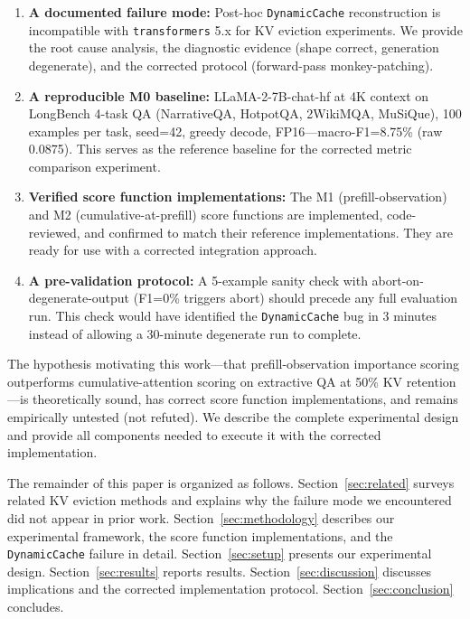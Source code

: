 \begin{enumerate}
\item \textbf{A documented failure mode:} Post-hoc \texttt{DynamicCache} reconstruction is incompatible with \texttt{transformers} 5.x for KV eviction experiments. We provide the root cause analysis, the diagnostic evidence (shape correct, generation degenerate), and the corrected protocol (forward-pass monkey-patching).

\item \textbf{A reproducible M0 baseline:} LLaMA-2-7B-chat-hf at 4K context on LongBench 4-task QA (NarrativeQA, HotpotQA, 2WikiMQA, MuSiQue), 100 examples per task, seed=42, greedy decode, FP16---macro-F1=8.75\% (raw 0.0875). This serves as the reference baseline for the corrected metric comparison experiment.

\item \textbf{Verified score function implementations:} The M1 (prefill-observation) and M2 (cumulative-at-prefill) score functions are implemented, code-reviewed, and confirmed to match their reference implementations. They are ready for use with a corrected integration approach.

\item \textbf{A pre-validation protocol:} A 5-example sanity check with abort-on-degenerate-output (F1=0\% triggers abort) should precede any full evaluation run. This check would have identified the \texttt{DynamicCache} bug in 3 minutes instead of allowing a 30-minute degenerate run to complete.
\end{enumerate}

The hypothesis motivating this work---that prefill-observation importance scoring outperforms cumulative-attention scoring on extractive QA at 50\% KV retention---is theoretically sound, has correct score function implementations, and remains empirically untested (not refuted). We describe the complete experimental design and provide all components needed to execute it with the corrected implementation.

The remainder of this paper is organized as follows. Section~\ref{sec:related} surveys related KV eviction methods and explains why the failure mode we encountered did not appear in prior work. Section~\ref{sec:methodology} describes our experimental framework, the score function implementations, and the \texttt{DynamicCache} failure in detail. Section~\ref{sec:setup} presents our experimental design. Section~\ref{sec:results} reports results. Section~\ref{sec:discussion} discusses implications and the corrected implementation protocol. Section~\ref{sec:conclusion} concludes.

